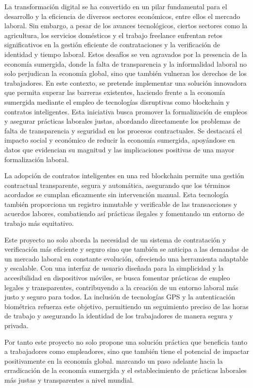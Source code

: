 
La transformación digital se ha convertido en un pilar fundamental para el desarrollo y la eficiencia de diversos sectores económicos, entre ellos el mercado laboral. Sin embargo, a pesar de los avances tecnológicos, ciertos sectores como la agricultura, los servicios domésticos y el trabajo freelance enfrentan retos significativos en la gestión eficiente de contrataciones y la verificación de identidad y tiempo laboral.
Estos desafíos se ven agravados por la presencia de la economía sumergida, donde la falta de transparencia y la informalidad laboral no solo perjudican la economía global, sino que también vulneran los derechos de los trabajadores.
En este contexto, se pretende implementar una solución innovadora que permita superar las barreras existentes, haciendo frente a la economía sumergida mediante el empleo de tecnologías disruptivas como blockchain y contratos inteligentes. Esta iniciativa busca promover la formalización de empleos y asegurar prácticas laborales justas, abordando directamente los problemas de falta de transparencia y seguridad en los procesos contractuales. Se destacará el impacto social y económico de reducir la economía sumergida, apoyándose en datos que evidencian su magnitud y las implicaciones positivas de una mayor formalización laboral.

La adopción de contratos inteligentes en una red blockchain permite una gestión contractual transparente, segura y automática, asegurando que los términos acordados se cumplan eficazmente sin intervención manual.
Esta tecnología también proporciona un registro inmutable y verificable de las transacciones y acuerdos labores, combatiendo así prácticas ilegales y fomentando un entorno de trabajo más equitativo.

Este proyecto no solo aborda la necesidad de un sistema de contratación y verificación más eficiente y seguro sino que también se anticipa a las demandas de un mercado laboral en constante evolución, ofreciendo una herramienta adaptable y escalable. Con una interfaz de usuario diseñada para la simplicidad y la accesibilidad en dispositivos móviles, se busca fomentar prácticas de empleo legales y transparentes, contribuyendo a la creación de un entorno laboral más justo y seguro para todos.
La inclusión de tecnologías GPS y la autenticación biométrica refuerza este objetivo, permitiendo un seguimiento preciso de las horas de trabajo y asegurando la identidad de los trabajadores de manera segura y privada.

Por tanto este proyecto no solo propone una solución práctica que beneficia tanto a trabajadores como empleadores, sino que también tiene el potencial de impactar positivamente en la economía global. marcando un paso adelante hacia la erradicación de la economía sumergida y el establecimiento de prácticas laborales más justas y transparentes a nivel mundial.